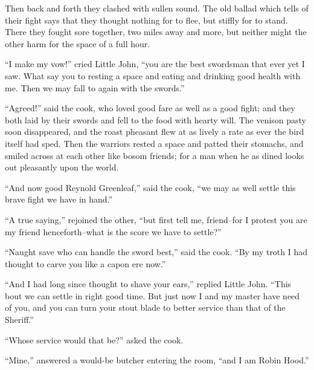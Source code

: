 Then back and forth they clashed with sullen sound. The old ballad which
tells of their fight says that they thought nothing for to flee, but
stiffly for to stand. There they fought sore together, two miles away
and more, but neither might the other harm for the space of a full hour.

``I make my vow!'' cried Little John, ``you are the best swordsman that
ever yet I saw. What say you to resting a space and eating and drinking
good health with me. Then we may fall to again with the swords.''

``Agreed!'' said the cook, who loved good fare as well as a good fight;
and they both laid by their swords and fell to the food with hearty
will. The venison pasty soon disappeared, and the roast pheasant flew at
as lively a rate as ever the bird itself had sped. Then the warriors
rested a space and patted their stomachs, and smiled across at each
other like bosom friends; for a man when he as dined looks out
pleasantly upon the world.

``And now good Reynold Greenleaf,'' said the cook, ``we may as well
settle this brave fight we have in hand.''

``A true saying,'' rejoined the other, ``but first tell me, friend--for
I protest you are my friend henceforth--what is the score we have to
settle?''

``Naught save who can handle the sword best,'' said the cook. ``By my
troth I had thought to carve you like a capon ere now.''

``And I had long since thought to shave your ears,'' replied Little
John. ``This bout we can settle in right good time. But just now I and
my master have need of you, and you can turn your stout blade to better
service than that of the Sheriff.''

``Whose service would that be?'' asked the cook.

``Mine,'' answered a would-be butcher entering the room, ``and I am
Robin Hood.''
